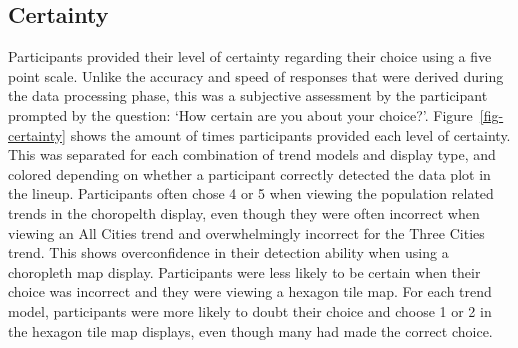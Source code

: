 \documentclass[
doublespace,
  times]{anzsauth}
\begin{document}
\subsection{Certainty}\label{certainty}

Participants provided their level of certainty regarding their choice
using a five point scale. Unlike the accuracy and speed of responses
that were derived during the data processing phase, this was a
subjective assessment by the participant prompted by the question: `How
certain are you about your choice?'. Figure~\ref{fig-certainty} shows
the amount of times participants provided each level of certainty. This
was separated for each combination of trend models and display type, and
colored depending on whether a participant correctly detected the data
plot in the lineup. Participants often chose 4 or 5 when viewing the
population related trends in the choropelth display, even though they
were often incorrect when viewing an All Cities trend and overwhelmingly
incorrect for the Three Cities trend. This shows overconfidence in their
detection ability when using a choropleth map display. Participants were
less likely to be certain when their choice was incorrect and they were
viewing a hexagon tile map. For each trend model, participants were more
likely to doubt their choice and choose 1 or 2 in the hexagon tile map
displays, even though many had made the correct choice.
\end{document}
